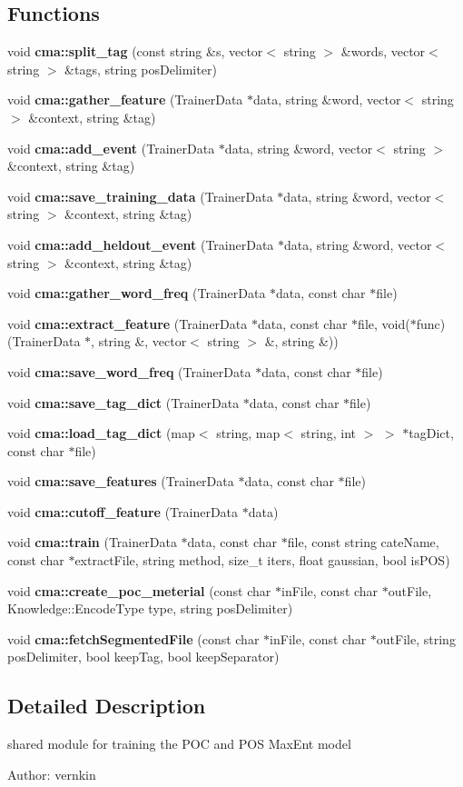 \subsection*{Functions}
\begin{CompactItemize}
\item 
void {\bf cma::split\_\-tag} (const string \&s, vector$<$ string $>$ \&words, vector$<$ string $>$ \&tags, string posDelimiter)
\item 
void {\bf cma::gather\_\-feature} (TrainerData $\ast$data, string \&word, vector$<$ string $>$ \&context, string \&tag)
\item 
void {\bf cma::add\_\-event} (TrainerData $\ast$data, string \&word, vector$<$ string $>$ \&context, string \&tag)
\item 
void {\bf cma::save\_\-training\_\-data} (TrainerData $\ast$data, string \&word, vector$<$ string $>$ \&context, string \&tag)
\item 
void {\bf cma::add\_\-heldout\_\-event} (TrainerData $\ast$data, string \&word, vector$<$ string $>$ \&context, string \&tag)
\item 
void {\bf cma::gather\_\-word\_\-freq} (TrainerData $\ast$data, const char $\ast$file)
\item 
void {\bf cma::extract\_\-feature} (TrainerData $\ast$data, const char $\ast$file, void($\ast$func)(TrainerData $\ast$, string \&, vector$<$ string $>$ \&, string \&))
\item 
void {\bf cma::save\_\-word\_\-freq} (TrainerData $\ast$data, const char $\ast$file)
\item 
void {\bf cma::save\_\-tag\_\-dict} (TrainerData $\ast$data, const char $\ast$file)
\item 
void {\bf cma::load\_\-tag\_\-dict} (map$<$ string, map$<$ string, int $>$ $>$ $\ast$tagDict, const char $\ast$file)
\item 
void {\bf cma::save\_\-features} (TrainerData $\ast$data, const char $\ast$file)
\item 
void {\bf cma::cutoff\_\-feature} (TrainerData $\ast$data)
\item 
void {\bf cma::train} (TrainerData $\ast$data, const char $\ast$file, const string cateName, const char $\ast$extractFile, string method, size\_\-t iters, float gaussian, bool isPOS)
\item 
void {\bf cma::create\_\-poc\_\-meterial} (const char $\ast$inFile, const char $\ast$outFile, Knowledge::EncodeType type, string posDelimiter)
\item 
void {\bf cma::fetchSegmentedFile} (const char $\ast$inFile, const char $\ast$outFile, string posDelimiter, bool keepTag, bool keepSeparator)
\end{CompactItemize}


\subsection{Detailed Description}
shared module for training the POC and POS MaxEnt model 

\begin{Desc}
\item[Author:]vernkin \end{Desc}
